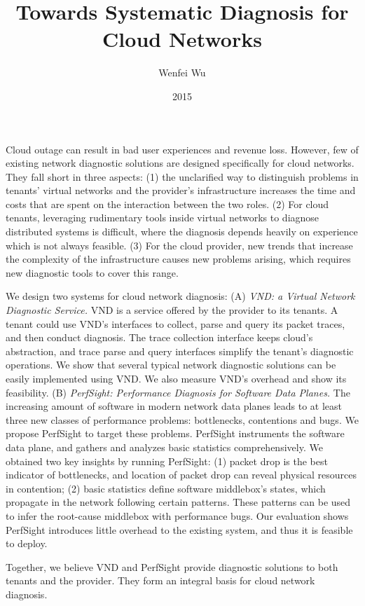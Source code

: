 \documentclass[10pt]{withesis}
\date{2015}
\title{Towards Systematic Diagnosis for Cloud Networks}
\author{Wenfei Wu}
\renewcommand{\emph}[1]{\textit{#1}}
\begin{document}
%

\begin{umiabstract}

Cloud outage can result in bad user experiences and revenue loss. However, few of existing network diagnostic solutions are designed specifically for cloud networks. They fall short in three aspects: (1) the unclarified way to distinguish problems in tenants’ virtual networks and the provider's infrastructure increases the time and costs that are spent on the interaction between the two roles. (2) For cloud tenants, leveraging rudimentary tools inside virtual networks to diagnose distributed systems is difficult, where the diagnosis depends heavily on experience which is not always feasible. (3) For the cloud provider, new trends that increase the complexity of the infrastructure causes new problems arising, which requires new diagnostic tools to cover this range.

We design two systems for cloud network diagnosis: (A) \emph{VND: a Virtual Network Diagnostic Service.} VND is a service offered by the provider to its tenants. A tenant could use VND's interfaces to collect, parse and query its packet traces, and then conduct diagnosis. The trace collection interface keeps cloud's abstraction, and trace parse and query interfaces simplify the tenant's diagnostic operations. We show that several typical network diagnostic solutions can be easily implemented using VND. We also measure VND's overhead and show its feasibility. (B) \emph{PerfSight: Performance Diagnosis for Software Data Planes.} The increasing amount of software in modern network data planes leads to at least three new classes of performance problems: bottlenecks, contentions and bugs. We propose PerfSight to target these problems. PerfSight instruments the software data plane, and gathers and analyzes basic statistics comprehensively. We obtained two key insights by running PerfSight: (1) packet drop is the best indicator of bottlenecks, and location of packet drop can reveal physical resources in contention; (2) basic statistics define software middlebox's states, which propagate in the network following certain patterns. These patterns can be used to infer the root-cause middlebox with performance bugs. Our evaluation shows PerfSight introduces little overhead to the existing system, and thus it is feasible to deploy.

Together, we believe VND and PerfSight provide diagnostic solutions to both tenants and the provider. They form an integral basis for cloud network diagnosis.



\end{umiabstract}
\end{document}
